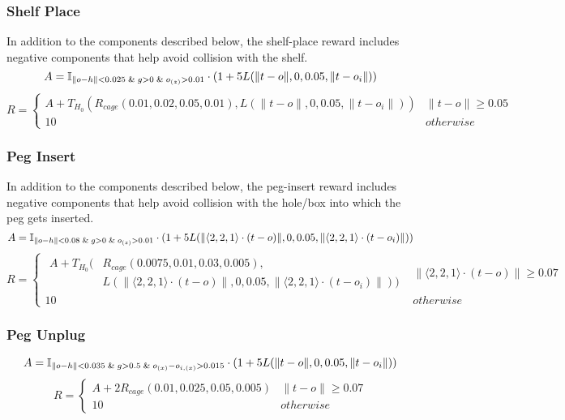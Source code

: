 {\subsubsection{Shelf Place}
In addition to the components described below, the shelf-place reward includes negative components that help avoid collision with the shelf.
\[
A=\mathbb{I}_{\lVert o - h \rVert < 0.025 \And g > 0 \And o_{(z)}>0.01} \cdot
    (1 + 5L(\lVert t - o \rVert, 0, 0.05, \lVert t - o_i \rVert))
\]
\[R=\left\{
\begin{array}{ll}
      A + T_{H_0}(
        R_{cage}(0.01,0.02,0.05,0.01),
        L(\lVert t - o \rVert, 0, 0.05, \lVert t - o_i \rVert))
        & \lVert t - o \rVert\geq 0.05 \\
      10 & otherwise
\end{array} \right. \]

\subsubsection{Peg Insert}
In addition to the components described below, the peg-insert reward includes negative components that help avoid collision with the hole/box into which the peg gets inserted.
\[
A=\mathbb{I}_{\lVert o - h \rVert < 0.08 \And g > 0 \And o_{(z)}>0.01} \cdot
    (1 + 5L(\lVert \langle2,2,1\rangle \cdot (t - o) \rVert, 0, 0.05, \lVert \langle2,2,1\rangle \cdot (t - o_i) \rVert))
\]
\[R=\left\{
\begin{array}{ll}
      \begin{aligned}
      A + T_{H_0}(&R_{cage}(0.0075,0.01,0.03,0.005),\\
      
        &L(\lVert \langle2,2,1\rangle \cdot (t - o) \rVert, 0, 0.05, \lVert \langle2,2,1\rangle \cdot (t - o_i) \rVert))
        \end{aligned}
        & \lVert \langle2,2,1\rangle \cdot (t - o) \rVert\geq 0.07 \\
      10 & otherwise
      
\end{array} \right. \]

\subsubsection{Peg Unplug}
\[
A=\mathbb{I}_{\lVert o - h \rVert < 0.035 \And g > 0.5 \And o_{(x)}-o_{i,(x)}>0.015} \cdot
    (1 + 5L(\lVert t - o \rVert, 0, 0.05, \lVert t - o_i \rVert))
\]
\[R=\left\{
\begin{array}{ll}
      A + 2R_{cage}(0.01,0.025,0.05,0.005)
        & \lVert t - o \rVert\geq 0.07 \\
      10 & otherwise
\end{array} \right. \]

}
